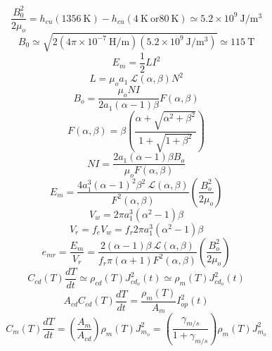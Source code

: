 \begin{equation}%
\frac{B_{0}^{2}}{2\mu_o}=h_{cu}(1356\ \mathrm{K})-h_{cu}(4\ \mathrm{K}\ \mathrm{or}80\ \mathrm{K})\simeq 5.2\times 10^9\ \mathrm{J/m^3}
\end{equation}
\begin{equation}%
B_0\simeq\sqrt{2(4\pi\times 10^{-7}\ \mathrm{H/m})(5.2\times 10^9\ \mathrm{J/m^3})}\simeq 115\ \mathrm{T}
\end{equation}
\begin{equation}%
E_m=\frac{1}{2}LI^2
\end{equation}
\begin{equation}%
L=\mu_oa_1\ \mathcal{L}(\alpha,\beta)N^2
\end{equation}
\begin{equation}%
B_o=\frac{\mu_oNI}{2a_1(\alpha-1)\beta}F(\alpha,\beta)
\end{equation}
\begin{equation}%
F(\alpha,\beta)=\beta\left(\frac{\alpha+\sqrt{\alpha^2+\beta^2}}{1+\sqrt{1+\beta^2}}\right)
\end{equation}
\begin{equation}%
NI=\frac{2a_1(\alpha-1)\beta B_o}{\mu_oF(\alpha,\beta)}
\end{equation}
\begin{equation}%
E_m=\frac{4a_{1}^{3}(\alpha-1)^2\beta^2\ \mathcal{L}(\alpha,\beta)}{F^2(\alpha,\beta)}\left(\frac{B_{o}^{2}}{2\mu_o}\right)
\end{equation}
\begin{equation}%
V_w=2\pi a_{1}^{3}(\alpha^2-1)\beta
\end{equation}
\begin{equation}%
V_r=f_eV_w=f_r2\pi a_{1}^{3}(\alpha^2-1)\beta
\end{equation}
\begin{equation}%
e_{mr}=\frac{E_m}{V_r}=\frac{2(\alpha-1)\beta\ \mathcal{L}(\alpha,\beta)}{f_r\pi(\alpha+1)F^2(\alpha,\beta)}\left(\frac{B_{o}^{2}}{2\mu_o}\right)
\end{equation}
\begin{equation}%
C_{cd}(T)\frac{dT}{dt}\simeq\rho_{cd}(T)J_{cd_o}^{2}(t) 
\simeq\rho_m(T)J_{cd_o}^{2}(t)
\end{equation}
\begin{equation}%
A_{cd}C_{cd}(T)\frac{dT}{dt}=\frac{\rho_m(T)}{A_m}I_{op}^{2}(t)
\end{equation}
\begin{equation}%
C_m(T)\frac{dT}{dt}=\left(\frac{A_m}{A_{cd}}\right)\rho_m(T)J_{m_o}^{2}=\left(\frac{\gamma_{m/s}}{1+\gamma_{m/s}}\right)\rho_m(T)J_{m_o}^{2}
\end{equation}
